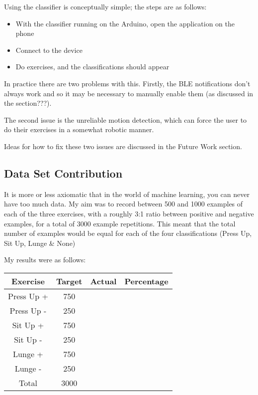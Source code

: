 \documentclass[a4paper]{article}
\begin{document}
Using the classifier is conceptually simple; the steps are as follows:

\begin{itemize}
\item With the classifier running on the Arduino, open the application on the phone
\item Connect to the device
\item Do exercises, and the classifications should appear
\end{itemize}

In practice there are two problems with this. Firstly, the BLE notifications don't always work and so it may be necessary to manually enable them (as discussed in the section???).

The second issue is the unreliable motion detection, which can force the user to do their exercises in a somewhat robotic manner. 

Ideas for how to fix these two issues are discussed in the Future Work section. 

\subsection{Data Set Contribution}

It is more or less axiomatic that in the world of machine learning, you can never have too much data. My aim was to record between 500 and 1000 examples of each of the three exercises, with a roughly 3:1 ratio between positive and negative examples, for a total of 3000 example repetitions. This meant that the total number of examples would be equal for each of the four classifications (Press Up, Sit Up, Lunge \& None)

My results were as follows:

\begin{center}
  \begin{tabular}{|c|c|c|c|}
      \hline
      Exercise & Target & Actual & Percentage \\
      \hline
      Press Up + & 750 & & \\
      \hline
      Press Up - & 250 & & \\
      \hline
      Sit Up + & 750 & & \\
      \hline
      Sit Up - & 250 & & \\
      \hline
      Lunge + & 750 & & \\
      \hline
      Lunge - & 250 & & \\
      \hline
      Total & 3000 & & \\
      \hline
      \end{tabular}
\end{center}
\end{document}
